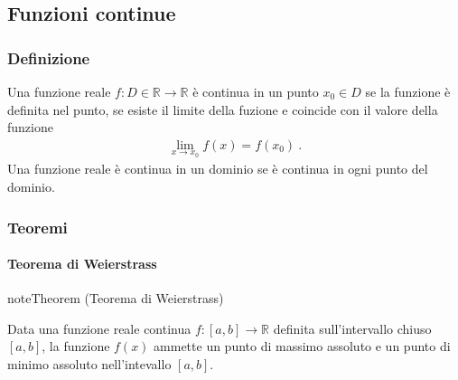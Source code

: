 \documentclass[letterpaper,10pt,italian]{jupyterBook}
\begin{document}
\subsection{Funzioni continue}
\label{\detokenize{ch/infinitesimal_calculus/analysis:funzioni-continue}}\label{\detokenize{ch/infinitesimal_calculus/analysis:infinitesimal-calculus-continuous-fun}}

\subsubsection{Definizione}
\label{\detokenize{ch/infinitesimal_calculus/analysis:infinitesimal-calculus-continuous-fun-def}}\label{\detokenize{ch/infinitesimal_calculus/analysis:id1}}
\sphinxAtStartPar
Una funzione reale \(f: D \in \mathbb{R} \rightarrow \mathbb{R}\) è continua in un punto \(x_0 \in D\) se la funzione è definita nel punto, se esiste il limite della fuzione e coincide con il valore della funzione
\begin{equation*}
\begin{split}\lim_{x \rightarrow x_0} f(x) = f(x_0) \ .\end{split}
\end{equation*}
\sphinxAtStartPar
Una funzione reale è continua in un dominio  se è continua in ogni punto del dominio.


\subsubsection{Teoremi}
\label{\detokenize{ch/infinitesimal_calculus/analysis:teoremi}}\label{\detokenize{ch/infinitesimal_calculus/analysis:infinitesimal-calculus-continuous-fun-thms}}

\paragraph{Teorema di Weierstrass}
\label{\detokenize{ch/infinitesimal_calculus/analysis:teorema-di-weierstrass}}\label{\detokenize{ch/infinitesimal_calculus/analysis:infinitesimal-calculus-continuous-fun-thms-weierstrass}}\label{None:thm:infinitesimal-calculus:continuous-fun:thms:weierstrass}
\begin{sphinxadmonition}{note}{Theorem  (Teorema di Weierstrass)}



\sphinxAtStartPar
Data una funzione reale continua \(f: [a,b] \rightarrow \mathbb{R}\) definita sull’intervallo chiuso \([a,b]\), la funzione \(f(x)\) ammette un punto di massimo assoluto e un punto di minimo assoluto nell’intevallo \([a,b]\).
\end{sphinxadmonition}
\end{document}
